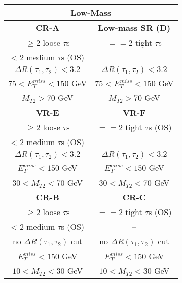 %
\begin{tabular}{cc}
\hline
\multicolumn{2}{c}{\textbf{Low-Mass}} \\ \hline \hline
\multicolumn{1}{c|}{\textbf{CR-A}} & \textbf{Low-mass SR (D)} \\ \hline
\multicolumn{1}{c|}{$\geq2$ loose $\tau$s} & $==2$ tight $\tau$s \\
\multicolumn{1}{c|}{< 2 medium $\tau$s (OS)} & -- \\
\multicolumn{1}{c|}{$\Delta R(\tau_1,\tau_2) <3.2$} & $\Delta R(\tau_1,\tau_2) <3.2$ \\
\multicolumn{1}{c|}{$75<E_T^{miss}<150$ GeV} & $75<E_T^{miss}<150$ GeV \\
\multicolumn{1}{c|}{$M_{T2} > 70$ GeV} & $M_{T2} > 70$ GeV \\ \hline \hline
\multicolumn{1}{c|}{\textbf{VR-E}} & \textbf{VR-F} \\ \hline
\multicolumn{1}{c|}{$\geq2$ loose $\tau$s} & $==2$ tight $\tau$s (OS) \\
\multicolumn{1}{c|}{< 2 medium $\tau$s (OS)} & -- \\
\multicolumn{1}{c|}{$\Delta R(\tau_1,\tau_2) <3.2$} & $\Delta R(\tau_1,\tau_2) <3.2$ \\
\multicolumn{1}{c|}{$E_T^{miss}<150$ GeV} & $E_T^{miss}<150$ GeV \\
\multicolumn{1}{c|}{$30 < M_{T2} < 70$ GeV} & $30 < M_{T2} < 70$ GeV \\ \hline \hline
\multicolumn{1}{c|}{\textbf{CR-B}} & \textbf{CR-C} \\ \hline
\multicolumn{1}{c|}{$\geq2$ loose $\tau$s} & $==2$ tight $\tau$s (OS) \\
\multicolumn{1}{c|}{< 2 medium $\tau$s (OS)} & -- \\
\multicolumn{1}{c|}{no $\Delta R(\tau_1,\tau_2)$ cut} & no $\Delta R(\tau_1,\tau_2)$ cut \\
\multicolumn{1}{c|}{$E_T^{miss}<150$ GeV} & $E_T^{miss}<150$ GeV \\
\multicolumn{1}{c|}{$10 < M_{T2} < 30$ GeV} & $10 < M_{T2} < 30$ GeV \\ \hline 
\end{tabular}

%
%